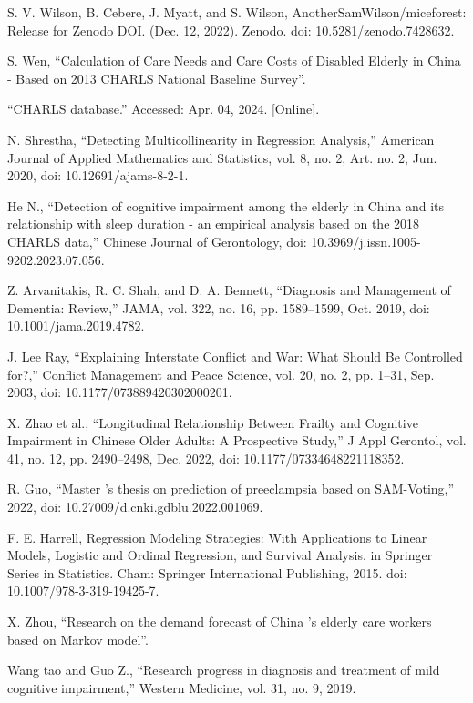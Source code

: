 \documentclass{base}
\begin{document}
\noindent[3] S. V. Wilson, B. Cebere, J. Myatt, and S. Wilson, AnotherSamWilson/miceforest: Release for Zenodo DOI. (Dec. 12, 2022). Zenodo. doi: 10.5281/zenodo.7428632.

\noindent[4] S. Wen, “Calculation of Care Needs and Care Costs of Disabled Elderly in China - Based  on 2013 CHARLS National Baseline Survey”.

\noindent[5] “CHARLS database.” Accessed: Apr. 04, 2024. [Online].

\noindent[6] N. Shrestha, “Detecting Multicollinearity in Regression Analysis,” American Journal of Applied Mathematics and Statistics, vol. 8, no. 2, Art. no. 2, Jun. 2020, doi: 10.12691/ajams-8-2-1.

\noindent[7] He N., “Detection of cognitive impairment among the elderly in China and its relationship with sleep duration - an empirical analysis based on the 2018 CHARLS data,” Chinese Journal of Gerontology, doi: 10.3969/j.issn.1005-9202.2023.07.056.

\noindent[8] Z. Arvanitakis, R. C. Shah, and D. A. Bennett, “Diagnosis and Management of Dementia: Review,” JAMA, vol. 322, no. 16, pp. 1589–1599, Oct. 2019, doi: 10.1001/jama.2019.4782.

\noindent[9] J. Lee Ray, “Explaining Interstate Conflict and War: What Should Be Controlled for?,” Conflict Management and Peace Science, vol. 20, no. 2, pp. 1–31, Sep. 2003, doi: 10.1177/073889420302000201.

\noindent[10] X. Zhao et al., “Longitudinal Relationship Between Frailty and Cognitive Impairment in Chinese Older Adults: A Prospective Study,” J Appl Gerontol, vol. 41, no. 12, pp. 2490–2498, Dec. 2022, doi: 10.1177/07334648221118352.

\noindent[11] R. Guo, “Master ’s thesis on prediction of preeclampsia based on SAM-Voting,” 2022, doi: 10.27009/d.cnki.gdblu.2022.001069.

\noindent[12] F. E. Harrell, Regression Modeling Strategies: With Applications to Linear Models, Logistic and Ordinal Regression, and Survival Analysis. in Springer Series in Statistics. Cham: Springer International Publishing, 2015. doi: 10.1007/978-3-319-19425-7.

\noindent[13] X. Zhou, “Research on the demand forecast of China ’s elderly care workers based on Markov model”.

\noindent[14] Wang  tao and Guo Z., “Research progress in diagnosis and treatment of mild cognitive impairment,” Western Medicine, vol. 31, no. 9, 2019.
\end{document}
